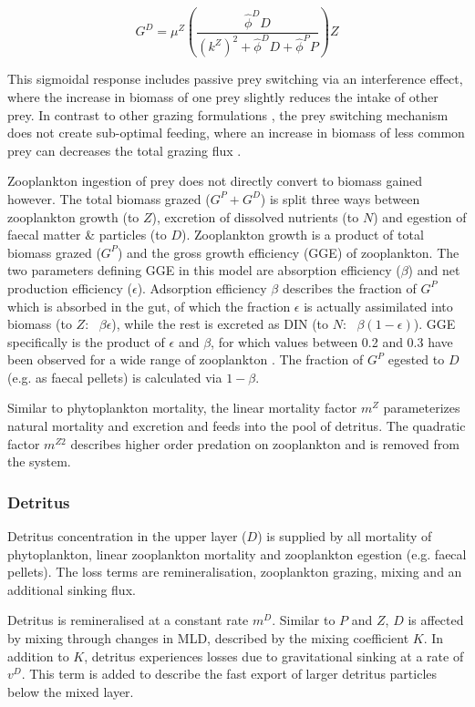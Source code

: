 \documentclass[journal abbreviations, manuscript]{copernicus}
\begin{document}
\begin{equation}
    G^D = \mu^Z \left( \frac{ \hat{\phi}^D D}{(k^Z)^2 + \hat{\phi}^D D +\hat{\phi}^P P}  \right) Z
\end{equation}

This sigmoidal response includes passive prey switching via an interference effect, where the increase in biomass of one prey slightly reduces the intake of other prey. In contrast to other grazing formulations \citep[e.g.][]{Fasham1990a}, the prey switching mechanism does not create sub-optimal feeding, where an increase in biomass of less common prey can decreases the total grazing flux \citep{Gentleman2003a}.

Zooplankton ingestion of prey does not directly convert to biomass gained however. The total biomass grazed ($G^P + G^D$) is split three ways between zooplankton growth (to $Z$), excretion of dissolved nutrients (to $N$) and egestion of faecal matter \& particles (to $D$). Zooplankton growth is a product of total biomass grazed ($G^P$) and the gross growth efficiency (GGE) of zooplankton. The two parameters defining GGE in this model are absorption efficiency ($\beta$) and net production efficiency ($\epsilon$). Adsorption efficiency $\beta$ describes the fraction of $G^P$ which is absorbed in the gut, of which the fraction $\epsilon$ is actually assimilated into biomass (to $Z$: \ $\beta \epsilon$), while the rest is excreted as DIN (to $N$: \ $\beta (1-\epsilon)$). GGE specifically is the product of $\epsilon$ and $\beta$, for which values between 0.2 and 0.3 have been observed for a wide range of zooplankton \citep{Straile1997GrossGroup}. The fraction of $G^P$ egested to $D$ (e.g. as faecal pellets) is calculated via $1-\beta$. 

Similar to phytoplankton mortality, the linear mortality factor $m^Z$ parameterizes natural mortality and excretion and feeds into the pool of detritus. The quadratic factor $m^{Z2}$ describes higher order predation on zooplankton and is removed from the system. 

\subsubsection{Detritus}
Detritus concentration in the upper layer ($D$) is supplied by all mortality of phytoplankton, linear zooplankton mortality and zooplankton egestion (e.g. faecal pellets). The loss terms are remineralisation, zooplankton grazing, mixing and an additional sinking flux. 

Detritus is remineralised at a constant rate $m^D$. Similar to $P$ and $Z$, $D$ is affected by mixing through changes in MLD, described by the mixing coefficient $K$. In addition to $K$, detritus experiences losses due to gravitational sinking at a rate of $v^D$. This term is added to describe the fast export of larger detritus particles below the mixed layer. 
\end{document}
